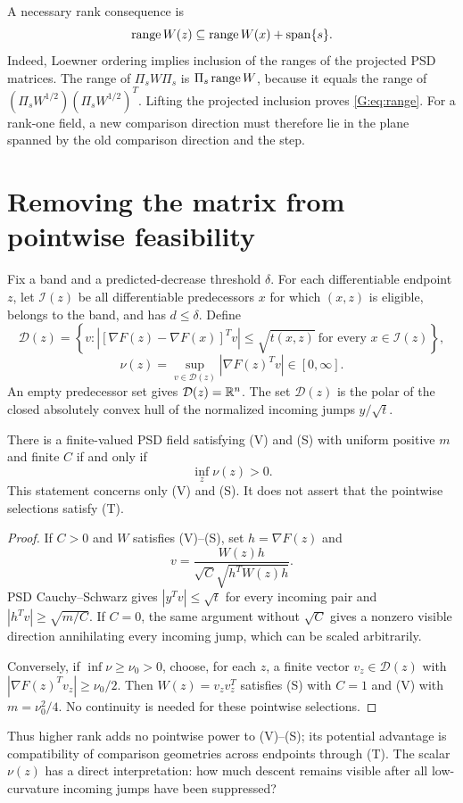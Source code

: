 A necessary rank consequence is
\begin{equation}
 \operatorname{range} W(z)\subseteq\operatorname{range} W(x)+\operatorname{span}\{s\}. \label{G:eq:range}
\end{equation}
Indeed, Loewner ordering implies inclusion of the ranges of the projected PSD matrices. The range of $\Pi_sW\Pi_s$ is $\Pi_s\operatorname{range} W$, because it equals the range of $(\Pi_sW^{1/2})(\Pi_sW^{1/2})^T$. Lifting the projected inclusion proves \eqref{G:eq:range}. For a rank-one field, a new comparison direction must therefore lie in the plane spanned by the old comparison direction and the step.


\setcounter{section}{2}
\setcounter{theorem}{0}
\setcounter{equation}{3}
\section{Removing the matrix from pointwise feasibility}
Fix a band and a predicted-decrease threshold $\delta$. For each differentiable endpoint $z$, let $\mathcal I(z)$ be all differentiable predecessors $x$ for which $(x,z)$ is eligible, belongs to the band, and has $d\le\delta$. Define
\[
 \mathcal D(z)=\left\{v:\left|[\nabla F(z)-\nabla F(x)]^Tv\right|
       \le\sqrt{t(x,z)}\ \text{for every }x\in\mathcal I(z)\right\},
\]
\begin{equation}
 \nu(z)=\sup_{v\in\mathcal D(z)}|\nabla F(z)^Tv|\in[0,\infty]. \label{G:eq:nu}
\end{equation}
An empty predecessor set gives $\mathcal D(z)=\mathbb R^n$. The set $\mathcal D(z)$ is the polar of the closed absolutely convex hull of the normalized incoming jumps $y/\sqrt t$.

\begin{proposition}
There is a finite-valued PSD field satisfying (V) and (S) with uniform positive $m$ and finite $C$ if and only if
\[
 \inf_z\nu(z)>0.
\]
This statement concerns only (V) and (S). It does not assert that the pointwise selections satisfy (T).
\end{proposition}
\begin{proof}
If $C>0$ and $W$ satisfies (V)--(S), set $h=\nabla F(z)$ and
\[
 v=\frac{W(z)h}{\sqrt C\sqrt{h^TW(z)h}}.
\]
PSD Cauchy--Schwarz gives $|y^Tv|\le\sqrt t$ for every incoming pair and
$|h^Tv|\ge\sqrt{m/C}$. If $C=0$, the same argument without $\sqrt C$ gives a nonzero visible direction annihilating every incoming jump, which can be scaled arbitrarily.

Conversely, if $\inf\nu\ge\nu_0>0$, choose, for each $z$, a finite vector $v_z\in\mathcal D(z)$ with $|\nabla F(z)^Tv_z|\ge\nu_0/2$. Then $W(z)=v_zv_z^T$ satisfies (S) with $C=1$ and (V) with $m=\nu_0^2/4$. No continuity is needed for these pointwise selections.
\end{proof}
Thus higher rank adds no pointwise power to (V)--(S); its potential advantage is compatibility of comparison geometries across endpoints through (T). The scalar $\nu(z)$ has a direct interpretation: how much descent remains visible after all low-curvature incoming jumps have been suppressed?

